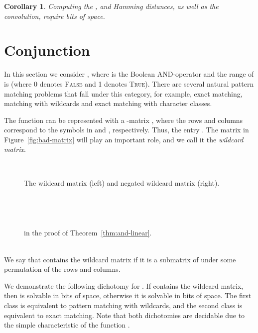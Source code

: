 \documentclass{article}
\newcommand{\TRUE}{\textsc{True}\xspace}
\newcommand{\FALSE}{\textsc{False}\xspace}
\theoremstyle{plain}
\newtheorem{corollary}[theorem]{Corollary}
\theoremstyle{definition}
\begin{document}
\begin{corollary}
    \label{cor:standard-addition}
    Computing the ,  and Hamming distances, as well as the convolution, require  bits of space.
\end{corollary}


\section{Conjunction} \label{sec:wildcard}

In this section we consider , where  is the Boolean AND-operator and the range of  is  (where 0 denotes \FALSE and 1 denotes \TRUE). There are several natural pattern matching problems that fall under this category, for example, exact matching, matching with wildcards and exact matching with character classes.

The function  can be represented with a -matrix , where the rows and columns correspond to the symbols in  and , respectively. Thus, the entry . The  matrix in Figure~\ref{fig:bad-matrix} will play an important role, and we call it the \emph{wildcard matrix}.

\begin{figure}[t]
    ~
    \hfill
    \begin{minipage}[b]{0.5\linewidth}
        
        \vspace{1pt}
        \caption{\label{fig:bad-matrix}The wildcard matrix (left) and negated wildcard matrix (right).}
    \end{minipage}
    ~
    \hfill
    ~
    \begin{minipage}[b]{0.3\linewidth}
         

         \caption{\label{fig:and-linear} in the proof of Theorem~\ref{thm:and-linear}.\\~}
          \vspace{-18.25pt}
    \end{minipage}
    \hfill
    ~
\end{figure}

We say that  contains the wildcard matrix if it is a submatrix of  under some permutation of the rows and columns.

We demonstrate the following dichotomy for . If  contains the wildcard matrix, then  is solvable in  bits of space, otherwise it is solvable in  bits of space. The first class is equivalent to pattern matching with wildcards, and the second class is equivalent to exact matching. Note that both dichotomies are decidable due to the simple characteristic of the function .
\end{document}

